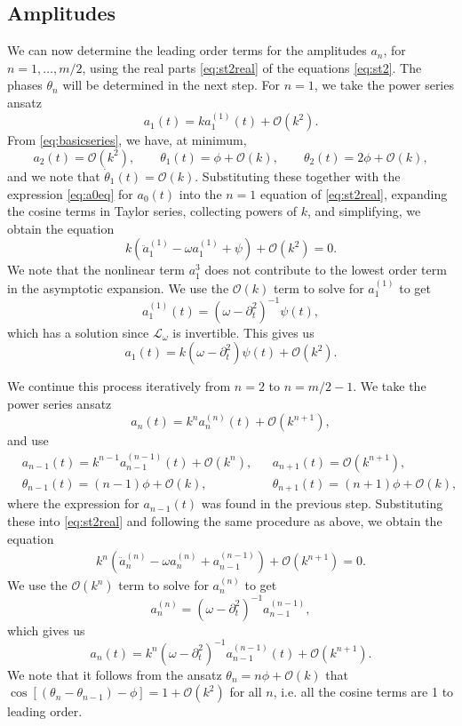 \documentclass[11pt,reqno]{amsart}
\def\Lw{{\mathcal{L}_\omega}}
\begin{document}
\subsection{Amplitudes}

We can now determine the leading order terms for the amplitudes $a_n$, for $n = 1, \dots, m/2$, using the real parts \cref{eq:st2real} of the equations \cref{eq:st2}. The phases $\theta_n$ will be determined in the next step. For $n=1$, we take the power series ansatz 
\[
a_1(t) = k a_1^{(1)}(t) + \mathcal{O}(k^2).
\]
From \cref{eq:basicseries}, we have, at minimum,
\[
a_2(t) = \mathcal{O}(k^2), \qquad \theta_1(t) = \phi + \mathcal{O}(k), \qquad \theta_2(t) = 2 \phi + \mathcal{O}(k),
\]
and we note that $\dot \theta_1(t) = \mathcal{O}(k)$. Substituting these together with the expression \cref{eq:a0eq} for $a_0(t)$ into the $n=1$ equation of \cref{eq:st2real}, expanding the cosine terms in Taylor series, collecting powers of $k$, and simplifying, we obtain the equation
\[
k\left(\ddot a_1^{(1)} - \omega a_1^{(1)} + \psi\right) + \mathcal{O}(k^2) = 0.
\]
We note that the nonlinear term $a_1^3$ does not contribute to the lowest order term in the asymptotic expansion. We use the $\mathcal{O}(k)$ term to solve for $a_1^{(1)}$ to get 
\begin{equation}\label{eq:a11}
a_1^{(1)}(t) = (\omega - \partial_t^2)^{-1} \psi(t),
\end{equation}
which has a solution since $\Lw$ is invertible. This gives us
\begin{equation}\label{eq:a1eq}
a_1(t) = k (\omega - \partial_t^2) \psi(t) + \mathcal{O}(k^2).
\end{equation}

We continue this process iteratively from $n=2$ to $n=m/2-1$. We take the power series ansatz 
\[
a_n(t) = k^n a_n^{(n)}(t) + \mathcal{O}(k^{n+1}),
\]
and use
\begin{align*}
&a_{n-1}(t) = k^{n-1} a_{n-1}^{(n-1)}(t) + \mathcal{O}(k^{n}), &&a_{n+1}(t) = \mathcal{O}(k^{n+1}), \\
&\theta_{n-1}(t) = (n-1) \phi + \mathcal{O}(k), &&\theta_{n+1}(t) = (n+1) \phi + \mathcal{O}(k),
\end{align*}
where the expression for $a_{n-1}(t)$ was found in the previous step. Substituting these into \cref{eq:st2real} and following the same procedure as above, we obtain the equation
\begin{align*}
k^n\left(\ddot a_n^{(n)} - \omega a_n^{(n)} + a_{n-1}^{(n-1)}\right) +\mathcal{O}(k^{n+1}) = 0.
\end{align*}
We use the $\mathcal{O}(k^n)$ term to solve for $a_n^{(n)}$ to get 
\begin{equation}\label{eq:ann}
a_n^{(n)} = (\omega - \partial_t^2)^{-1}a_{n-1}^{(n-1)},
\end{equation}
which gives us
\begin{equation}\label{eq:aneq}
a_n(t) = k^n (\omega - \partial_t^2)^{-1}a_{n-1}^{(n-1)}(t) + \mathcal{O}(k^{n+1}).
\end{equation}
We note that it follows from the ansatz $\theta_n = n \phi + \mathcal{O}(k)$ that $\cos[(\theta_n - \theta_{n-1}) - \phi] = 1 + \mathcal{O}(k^2)$ for all $n$, i.e. all the cosine terms are 1 to leading order. 
\end{document}
